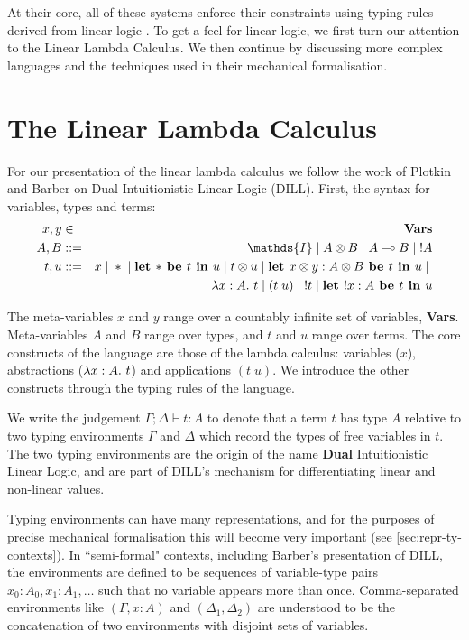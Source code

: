 \documentclass[]{unswthesis}
\newcommand{\lam}[1]{\lambda #1 \ldotp \,}
\newcommand{\app}[2]{(#1 \; #2)}
\newcommand{\lolly}{\multimap}
\newcommand{\types}{\vdash}
\newcommand{\letbe}[3]{\textbf{let $#1$ be $#2$ in $#3$}}
\newcommand{\sor}{\; | \;}
\let\b\textbf
\begin{document}
At their core, all of these systems enforce their constraints using typing rules derived from linear logic \cite{girard87}. To get a feel for linear logic, we first turn our attention to the Linear Lambda Calculus. We then continue by discussing more complex languages and the techniques used in their mechanical formalisation.

\section{The Linear Lambda Calculus}

For our presentation of the linear lambda calculus we follow the work of Plotkin and Barber \cite{barber96} on Dual Intuitionistic Linear Logic (DILL). First, the syntax for variables, types and terms:
\begin{eqnarray*}
x,y & \in & \b{Vars} \\
A, B & ::= & \mathds{I} \sor A \otimes B \sor A \lolly B \sor {!A} \\
t, u & ::= & x \sor * \sor \letbe{*}{t}{u} \sor t \otimes u \sor \letbe{x \otimes y : A \otimes B}{t}{u} \sor \\
  &     & \lam{x : A} t \sor \app{t}{u} \sor {!t} \sor \letbe{!x : A}{t}{u}
\end{eqnarray*}

The meta-variables $x$ and $y$ range over a countably infinite set of variables, \b{Vars}. Meta-variables $A$ and $B$ range over types, and $t$ and $u$ range over terms. The core constructs of the language are those of the lambda calculus: variables ($x$), abstractions ($\lam{x : A} t$) and applications $\app{t}{u}$. We introduce the other constructs through the typing rules of the language.

We write the judgement $\Gamma; \Delta \types t : A$ to denote that a term $t$ has type $A$ relative to two typing environments $\Gamma$ and $\Delta$ which record the types of free variables in $t$. The two typing environments are the origin of the name \b{Dual} Intuitionistic Linear Logic, and are part of DILL's mechanism for differentiating linear and non-linear values.

Typing environments can have many representations, and for the purposes of precise mechanical formalisation this will become very important (see \cref{sec:repr-ty-contexts}). In ``semi-formal" contexts, including Barber's presentation of DILL, the environments are defined to be sequences of variable-type pairs $x_0 : A_0, x_1 : A_1, \dots$ such that no variable appears more than once. Comma-separated environments like $(\Gamma, x : A)$ and $(\Delta_1, \Delta_2)$ are understood to be the concatenation of two environments with disjoint sets of variables.
\end{document}
